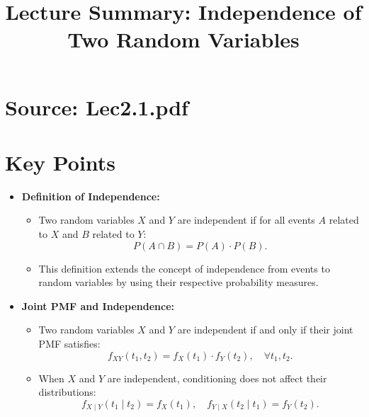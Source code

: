 \documentclass{article}
\title{Lecture Summary: Independence of Two Random Variables}
\author{}
\date{}
\begin{document}
\maketitle

\section*{Source: Lec2.1.pdf}

\section*{Key Points}

\begin{itemize}
  \item \textbf{Definition of Independence:}
    \begin{itemize}
      \item Two random variables $X$ and $Y$ are independent if for all events $A$ related to $X$ and $B$ related to $Y$:
        \[
          P(A \cap B) = P(A) \cdot P(B).
        \]
      \item This definition extends the concept of independence from events to random variables by using their respective probability measures.
    \end{itemize}

  \item \textbf{Joint PMF and Independence:}
    \begin{itemize}
      \item Two random variables $X$ and $Y$ are independent if and only if their joint PMF satisfies:
        \[
          f_{XY}(t_1, t_2) = f_X(t_1) \cdot f_Y(t_2), \quad \forall t_1, t_2.
        \]
      \item When $X$ and $Y$ are independent, conditioning does not affect their distributions:
        \[
          f_{X \mid Y}(t_1 \mid t_2) = f_X(t_1), \quad f_{Y \mid X}(t_2 \mid t_1) = f_Y(t_2).
        \]
    \end{itemize}


\end{itemize}
\end{document}
